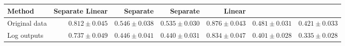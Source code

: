 \begin{center}
{\small
\begin{tabular}{l | r r r r r r}
Method & Separate Linear & Separate \gp{} & Separate \agp{} & Linear & \gp{} &\agp{} \\ \hline
Original data & $0.812 \pm 0.045$ & $0.546 \pm 0.038$ & $0.535 \pm 0.030$ & $0.876 \pm 0.043$ & $0.481 \pm 0.031$ & $\mathbf{0.421 \pm 0.033}$ \\
Log outputs   & $0.737 \pm 0.049$ & $0.446 \pm 0.041$ & $0.440 \pm 0.031$ & $0.834 \pm 0.047$ & $0.401 \pm 0.028$ & $\mathbf{0.335 \pm 0.028}$ \\
\end{tabular}
}
\end{center}
